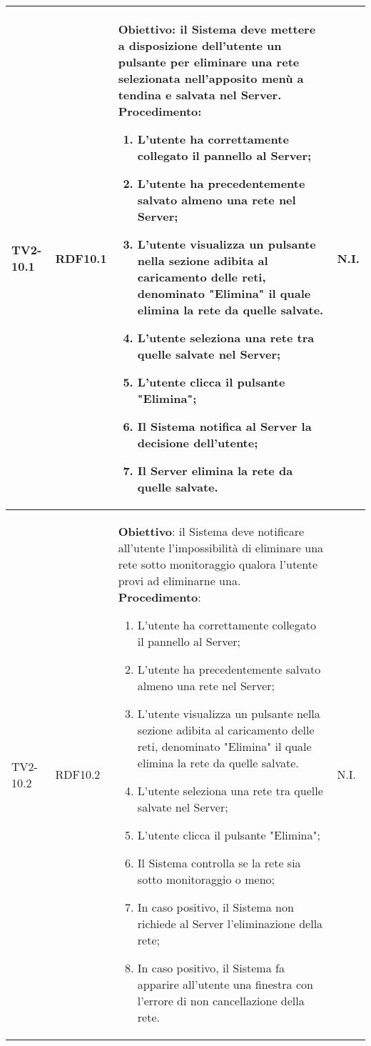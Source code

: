 \begin{longtable}{|C{.15\textwidth}|C{.13\textwidth}|m{.65\textwidth}|C{.08\textwidth}|}
TV2-10.1 & RDF10.1 &
	\textbf{Obiettivo}: il Sistema deve mettere a disposizione dell'utente un pulsante per eliminare una rete selezionata nell'apposito menù a tendina e salvata nel Server. \newline
	\textbf{Procedimento}:
	\begin{enumerate}
		\item L'utente ha correttamente collegato il pannello al Server;
		\item L'utente ha precedentemente salvato almeno una rete nel Server;
		\item L'utente visualizza un pulsante nella sezione adibita al caricamento delle reti, denominato "Elimina" il quale elimina la rete da quelle salvate.
		\item L'utente seleziona una rete tra quelle salvate nel Server;
		\item L'utente clicca il pulsante "Elimina";
		\item Il Sistema notifica al Server la decisione dell'utente;
		\item Il Server elimina la rete da quelle salvate.
	\end{enumerate}
	& N.I. \\
\hline

TV2-10.2 & RDF10.2 &
	\textbf{Obiettivo}: il Sistema deve notificare all'utente l'impossibilità di eliminare una rete sotto monitoraggio qualora l'utente provi ad eliminarne una. \newline
	\textbf{Procedimento}:
	\begin{enumerate}
		\item L'utente ha correttamente collegato il pannello al Server;
		\item L'utente ha precedentemente salvato almeno una rete nel Server;
		\item L'utente visualizza un pulsante nella sezione adibita al caricamento delle reti, denominato "Elimina" il quale elimina la rete da quelle salvate.
		\item L'utente seleziona una rete tra quelle salvate nel Server;
		\item L'utente clicca il pulsante "Elimina";
		\item Il Sistema controlla se la rete sia sotto monitoraggio o meno;
		\item In caso positivo, il Sistema non richiede al Server l'eliminazione della rete;
		\item In caso positivo, il Sistema fa apparire all'utente una finestra con l'errore di non cancellazione della rete.
	\end{enumerate}
	& N.I. \\
\hline


\end{longtable}
